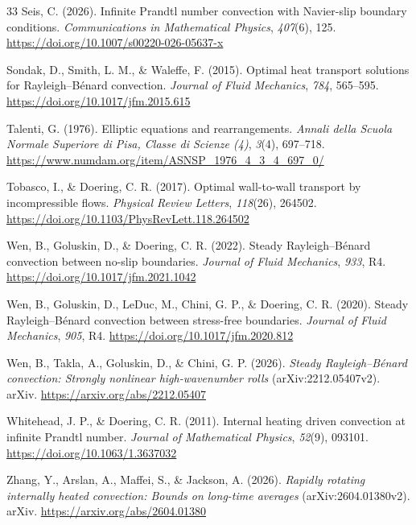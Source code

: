 \begin{thebibliography}{33}
Seis, C. (2026). Infinite Prandtl number convection with Navier-slip boundary conditions. \emph{Communications in Mathematical Physics}, \emph{407}(6), 125. \url{https://doi.org/10.1007/s00220-026-05637-x}

Sondak, D., Smith, L. M., \& Waleffe, F. (2015). Optimal heat transport solutions for Rayleigh--Bénard convection. \emph{Journal of Fluid Mechanics}, \emph{784}, 565--595. \url{https://doi.org/10.1017/jfm.2015.615}

Talenti, G. (1976). Elliptic equations and rearrangements. \emph{Annali della Scuola Normale Superiore di Pisa, Classe di Scienze (4)}, \emph{3}(4), 697--718. \url{https://www.numdam.org/item/ASNSP_1976_4_3_4_697_0/}

Tobasco, I., \& Doering, C. R. (2017). Optimal wall-to-wall transport by incompressible flows. \emph{Physical Review Letters}, \emph{118}(26), 264502. \url{https://doi.org/10.1103/PhysRevLett.118.264502}

Wen, B., Goluskin, D., \& Doering, C. R. (2022). Steady Rayleigh--Bénard convection between no-slip boundaries. \emph{Journal of Fluid Mechanics}, \emph{933}, R4. \url{https://doi.org/10.1017/jfm.2021.1042}

Wen, B., Goluskin, D., LeDuc, M., Chini, G. P., \& Doering, C. R. (2020). Steady Rayleigh--Bénard convection between stress-free boundaries. \emph{Journal of Fluid Mechanics}, \emph{905}, R4. \url{https://doi.org/10.1017/jfm.2020.812}

Wen, B., Takla, A., Goluskin, D., \& Chini, G. P. (2026). \emph{Steady Rayleigh--Bénard convection: Strongly nonlinear high-wavenumber rolls} (arXiv:2212.05407v2). arXiv. \url{https://arxiv.org/abs/2212.05407}

Whitehead, J. P., \& Doering, C. R. (2011). Internal heating driven convection at infinite Prandtl number. \emph{Journal of Mathematical Physics}, \emph{52}(9), 093101. \url{https://doi.org/10.1063/1.3637032}

Zhang, Y., Arslan, A., Maffei, S., \& Jackson, A. (2026). \emph{Rapidly rotating internally heated convection: Bounds on long-time averages} (arXiv:2604.01380v2). arXiv. \url{https://arxiv.org/abs/2604.01380}

\end{thebibliography}
